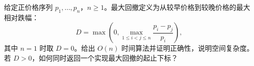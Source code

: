 给定正价格序列 $p_1,\ldots,p_n$，$n\ge1$。最大回撤定义为从较早价格到较晚价格的最大相对跌幅：
\[
 D=\max\left(0,\max_{1\le i<j\le n}\frac{p_i-p_j}{p_i}\right),
\]
其中 $n=1$ 时取 $D=0$。给出 $O(n)$ 时间算法并证明正确性，说明空间复杂度。若 $D>0$，如何同时返回一个实现最大回撤的起止下标？
